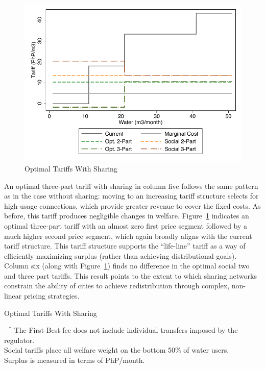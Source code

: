 \documentclass[12pt]{article}
\begin{document}
\begin{figure}[!htp]
\centering
\caption{Optimal Tariffs With Sharing}\label{figure:optimaltariffsharing}
\includegraphics{tables/shr_tariff_groups.pdf}
\end{figure}


An optimal three-part tariff with sharing in column five follows the same pattern as in the case without sharing: moving to an increasing tariff structure selects for high-usage connections, which provide greater revenue to cover the fixed costs.  As before, this tariff produces negligible changes in welfare.  Figure~\ref{figure:optimaltariffsharing} indicates an optimal three-part tariff with an almost zero first price segment followed by a much higher second price segment, which again broadly aligns with the current tariff structure.  This tariff structure supports the ``life-line'' tariff as a way of efficiently maximizing surplus (rather than achieving distributional goals).  Column six (along with Figure~\ref{figure:optimaltariffsharing}) finds no difference in the optimal social two and three part tariffs.  This result points to the extent to which sharing networks constrain the ability of cities to achieve redistribution through complex, non-linear pricing strategies.



\begin{table}[!hbp]
\centering
\caption{Optimal Tariffs With Sharing}\label{table:optimaltariffsharing}
\resizebox{\textwidth}{!}{%

}
\footnotesize{$\text{ }^{*}$ The First-Best fee does not include individual transfers imposed by the regulator. \\  Social tariffs place all welfare weight on the bottom 50\% of water users. \\ Surplus is measured in terms of PhP/month.}
\end{table}
\end{document}

